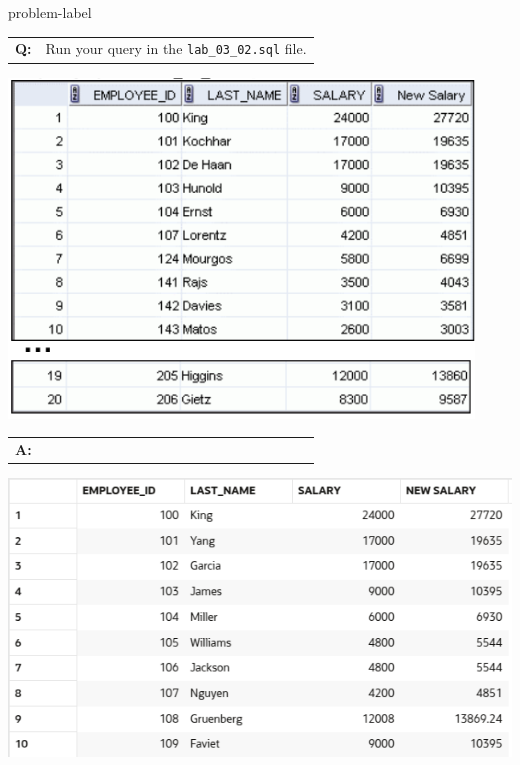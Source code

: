 \begin{problem}{}{problem-label}

\begin{tabular}{@{}l p{0.9\linewidth}@{}}
  \textbf{Q:} & Run your query in the \texttt{lab\_03\_02.sql} file.
\end{tabular}

\begin{center}
  \includegraphics[scale=0.8]{images/c3q3.png}
\end{center}

\begin{tabular}{@{}l p{0.9\linewidth}@{}}
  \textbf{A:} & 
\end{tabular}

\vspace{1em}

\begin{center}
  \includegraphics[scale=0.8]{images/c3a3.png}
\end{center}

\end{problem}

